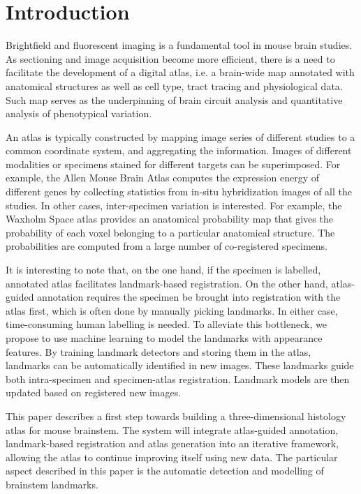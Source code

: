 \documentclass{llncs}
\begin{document}
\section{Introduction}

Brightfield and fluorescent imaging is a fundamental tool in mouse brain studies. As sectioning and image acquisition become more efficient, there is a need to facilitate the development of a digital atlas, i.e. a brain-wide map annotated with anatomical structures as well as cell type, tract tracing and physiological data. Such map serves as the underpinning of brain circuit analysis and quantitative analysis of phenotypical variation.

An atlas is typically constructed by mapping image series of different studies to a common coordinate system, and aggregating the information. 
Images of different modalities or specimens stained for different targets can be superimposed. For example, the Allen Mouse Brain Atlas\cite{lein2007genome} computes the expression energy of different genes by collecting statistics from in-situ hybridization images of all the studies. 
In other cases, inter-specimen variation is interested. For example, the Waxholm Space atlas\cite{lee2005standard} provides an anatomical probability map that gives the probability of each voxel belonging to a particular anatomical structure. The probabilities are computed from a large number of co-registered specimens.

It is interesting to note that, on the one hand, if the specimen is labelled, annotated atlas facilitates landmark-based registration. On the other hand, atlas-guided annotation requires the specimen be brought into registration with the atlas first, which is often done by manually picking landmarks. In either case, time-consuming human labelling is needed. To alleviate this bottleneck, we propose to use machine learning to model the landmarks with appearance features. By training landmark detectors and storing them in the atlas, landmarks can be automatically identified in new images. These landmarks guide both intra-specimen and specimen-atlas registration. Landmark models are then updated based on registered new images.

This paper describes a first step towards building a three-dimensional histology atlas for mouse brainstem. The system will integrate atlas-guided annotation, landmark-based registration and atlas generation into an iterative framework, allowing the atlas to continue improving itself using new data. The particular aspect described in this paper is the automatic detection and modelling of brainstem landmarks.
\end{document}
